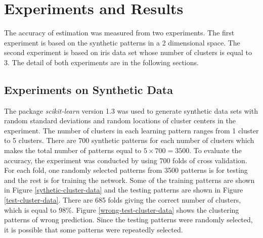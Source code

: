 \documentclass[lettersize,journal]{IEEEtran}
\begin{document}
\section{Experiments and Results}

The accuracy of estimation was measured from two experiments. The first experiment is based on the 
synthetic patterns in a 2 dimensional space. The second experiment is based on iris data set whose number 
of clusters is equal to 3. The detail of both experiments are in the following sections.

\subsection{Experiments on Synthetic Data} 

The package {\em scikit-learn} version 1.3 was used to generate synthetic data sets with random
standard deviations and random locations of cluster centers in the experiment. 
The number of clusters in each learning pattern ranges from 1 cluster to 5 clusters. There are 700 
synthetic patterns for each number of clusters which makes the total number of patterns equal to $5 \times 
700 = 3500$. To evaluate the accuracy, the experiment was conducted by using 700 folds of cross validation.
For each fold, one randomly selected patterns from 3500 patterns is for testing and the rest is
for training the network. Some of the training patterns are shown in Figure \ref{sythetic-cluster-data} 
and the testing patterns are shown in Figure \ref{test-cluster-data}. There are 685 folds giving the 
correct number of clusters, which is equal to 98\%. Figure \ref{wrong-test-cluster-data} shows the 
clustering patterns of wrong prediction. Since the testing patterns were randomly selected, it is
possible that some patterns were repeatedly selected.
\end{document}
